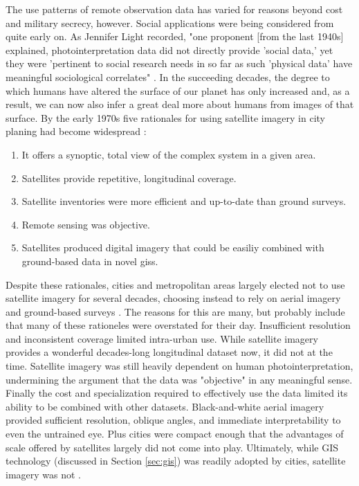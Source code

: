 The use patterns of remote observation data has varied for reasons beyond cost and military secrecy, however. Social applications were being considered from quite early on. As Jennifer Light recorded, "one proponent [from the last 1940s] explained, photointerpretation data did not directly provide 'social data,' yet they were 'pertinent to social research needs in so far as such 'physical data' have meaningful sociological correlates" \cite{lightWarfareWelfareDefense2005}. In the succeeding decades, the degree to which humans have altered the surface of our planet has only increased and, as a result, we can now also infer a great deal more about humans from images of that surface. By the early 1970s five rationales for using satellite imagery in city planing had become widespread \cite{lightWarfareWelfareDefense2005}:

\begin{enumerate}[itemsep=0pt,parsep=0pt]
	\item{It offers a synoptic, total view of the complex system in a given area.}
	\item{Satellites provide repetitive, longitudinal coverage.}
	\item{Satellite inventories were more efficient and up-to-date than ground surveys.}
	\item{Remote sensing was objective.}
	\item{Satellites produced digital imagery that could be easiliy combined with ground-based data in novel \acp{gis}.}
\end{enumerate}

Despite these rationales, cities and metropolitan areas largely elected not to use satellite imagery for several decades, choosing instead to rely on aerial imagery and ground-based surveys \cite{lightWarfareWelfareDefense2005}. The reasons for this are many, but probably include that many of these rationeles were overstated for their day. Insufficient resolution and inconsistent coverage limited intra-urban use. While satellite imagery provides a wonderful decades-long longitudinal dataset now, it did not at the time. Satellite imagery was still heavily dependent on human photointerpretation, undermining the argument that the data was "objective" in any meaningful sense. Finally the cost and specialization required to effectively use the data limited its ability to be combined with other datasets. Black-and-white aerial imagery provided sufficient resolution, oblique angles, and immediate interpretability to even the untrained eye. Plus cities were compact enough that the advantages of scale offered by satellites largely did not come into play. Ultimately, while GIS technology (discussed in Section \ref{sec:gis}) was readily adopted by cities, satellite imagery was not \cite{lightWarfareWelfareDefense2005}.

